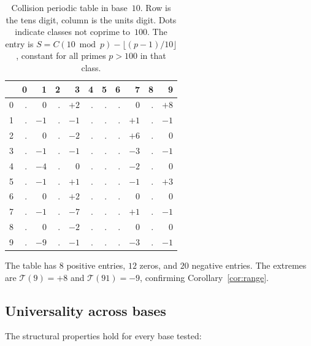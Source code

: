 \documentclass[12pt]{amsart}
\theoremstyle{definition}
\theoremstyle{remark}
\begin{document}
\begin{table}[h]
\centering
\begin{tabular}{r*{10}{r}}
\toprule
& 0 & 1 & 2 & 3 & 4 & 5 & 6 & 7 & 8 & 9 \\
\midrule
0 & . & $0$ & . & $+2$ & . & . & . & $0$ & . & $+8$ \\
1 & . & $-1$ & . & $-1$ & . & . & . & $+1$ & . & $-1$ \\
2 & . & $0$ & . & $-2$ & . & . & . & $+6$ & . & $0$ \\
3 & . & $-1$ & . & $-1$ & . & . & . & $-3$ & . & $-1$ \\
4 & . & $-4$ & . & $0$ & . & . & . & $-2$ & . & $0$ \\
5 & . & $-1$ & . & $+1$ & . & . & . & $-1$ & . & $+3$ \\
6 & . & $0$ & . & $+2$ & . & . & . & $0$ & . & $0$ \\
7 & . & $-1$ & . & $-7$ & . & . & . & $+1$ & . & $-1$ \\
8 & . & $0$ & . & $-2$ & . & . & . & $0$ & . & $0$ \\
9 & . & $-9$ & . & $-1$ & . & . & . & $-3$ & . & $-1$ \\
\bottomrule
\end{tabular}
\caption{Collision periodic table in base~$10$. Row is the
tens digit, column is the units digit. Dots indicate classes
not coprime to~$100$. The entry is
$S = C(10 \bmod p) - \lfloor(p{-}1)/10\rfloor$, constant
for all primes $p > 100$ in that class.}
\end{table}

The table has $8$ positive entries, $12$ zeros, and $20$
negative entries. The extremes are $\mathcal{T}(9) = +8$ and
$\mathcal{T}(91) = -9$, confirming Corollary~\ref{cor:range}.

\subsection*{Universality across bases}

The structural properties hold for every base tested:
\end{document}
